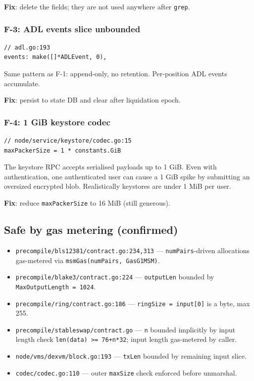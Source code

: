 \documentclass[11pt]{article}
\begin{document}
\textbf{Fix}: delete the fields; they are not used anywhere after
\verb|grep|.

\subsubsection{F-3: ADL events slice unbounded}

\begin{lstlisting}
// adl.go:193
events: make([]*ADLEvent, 0),
\end{lstlisting}

Same pattern as F-1: append-only, no retention. Per-position ADL
events accumulate.

\textbf{Fix}: persist to state DB and clear after liquidation epoch.

\subsubsection{F-4: 1 GiB keystore codec}

\begin{lstlisting}
// node/service/keystore/codec.go:15
maxPackerSize = 1 * constants.GiB
\end{lstlisting}

The keystore RPC accepts serialised payloads up to 1 GiB. Even with
authentication, one authenticated user can cause a 1 GiB spike by
submitting an oversized encrypted blob. Realistically keystores are
under 1 MiB per user.

\textbf{Fix}: reduce \verb|maxPackerSize| to 16 MiB (still generous).

\subsection{Safe by gas metering (confirmed)}

\begin{itemize}
  \item \texttt{precompile/bls12381/contract.go:234,313} —
    \verb|numPairs|-driven allocations gas-metered via
    \verb|msmGas(numPairs, GasG1MSM)|.
  \item \texttt{precompile/blake3/contract.go:224} —
    \verb|outputLen| bounded by \verb|MaxOutputLength = 1024|.
  \item \texttt{precompile/ring/contract.go:186} —
    \verb|ringSize = input[0]| is a byte, max 255.
  \item \texttt{precompile/stableswap/contract.go} — \verb|n| bounded
    implicitly by input length check \verb|len(data) >= 76+n*32|; input
    length gas-metered by caller.
  \item \texttt{node/vms/dexvm/block.go:193} —
    \verb|txLen| bounded by remaining input slice.
  \item \texttt{codec/codec.go:110} — outer \texttt{maxSize} check
    enforced before unmarshal.
\end{itemize}
\end{document}
